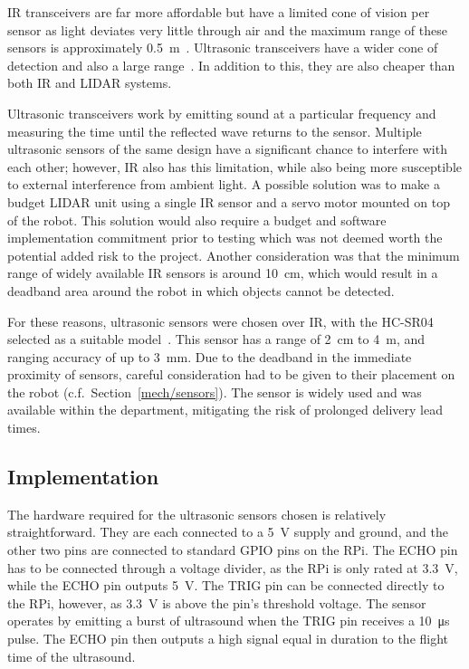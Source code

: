 IR transceivers are far more affordable but have a limited cone of
vision per sensor as light deviates very little through air and the
maximum range of these sensors is approximately \SI{0.5}{\m}~\cite{InfraredDatasheet}.
Ultrasonic transceivers have a wider cone of
detection and also a large range~\cite{HCSR04datasheet}. In addition to
this, they are also cheaper than both IR and LIDAR systems.

Ultrasonic transceivers work by emitting sound at a particular frequency
and measuring the time until the reflected wave returns to the sensor.
Multiple ultrasonic sensors of the same design have a significant chance to
interfere with each other; however, IR also has this limitation, while also being
more susceptible to external interference from ambient light. A possible
solution was to make a budget LIDAR unit using a single IR sensor and a
servo motor mounted on top of the robot. This solution would also require
a budget and software implementation commitment prior to testing which was
not deemed worth the potential added risk to the project. Another consideration
was that the minimum range of widely available IR sensors is around \SI{10}{\cm},
which would result in a deadband area around the robot in which objects cannot
be detected.

For these reasons, ultrasonic sensors were chosen over IR, with the HC-SR04
selected as a suitable model~\cite{HCSR04datasheet}. This sensor has a range
of \SI{2}{\cm} to \SI{4}{\m}, and ranging accuracy of up to \SI{3}{\mm}.
Due to the deadband in the immediate proximity of sensors, careful consideration
had to be given to their placement on the robot (c.f.\ Section~\ref{mech/sensors}).
The sensor is widely used and was available within the department, mitigating
the risk of prolonged delivery lead times.

\subsection{Implementation}\label{elec/range/impl}
The hardware required for the ultrasonic sensors chosen is relatively straightforward.
They are each connected to a \SI{5}{\volt} supply and ground, and the other two pins are
connected to standard GPIO pins on the RPi. The ECHO pin has to be connected through
a voltage divider, as the RPi is only rated at \SI{3.3}{\volt}, while the ECHO pin outputs \SI{5}{\volt}. The
TRIG pin can be connected directly to the RPi, however, as \SI{3.3}{\volt} is above
the pin's threshold voltage. The sensor operates by emitting a burst of ultrasound
when the TRIG pin receives a \SI{10}{\micro\second} pulse. The ECHO pin then outputs
a high signal equal in duration to the flight time of the ultrasound.

